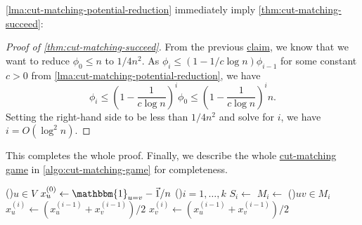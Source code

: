 \autoref{lma:cut-matching-potential-reduction} immediately imply \autoref{thm:cut-matching-succeed}:

\begin{proof}[Proof of \autoref{thm:cut-matching-succeed}]
	From the previous \hyperref[clm:cut-matching-goal]{claim}, we know that we want to reduce \(\phi _0 \leq n\) to \(1 / 4n^2\). As \(\phi _i \leq (1 - 1 / c \log n) \phi _{i-1}\) for some constant \(c>0\) from \autoref{lma:cut-matching-potential-reduction}, we have
	\[
		\phi _i \leq \left( 1 - \frac{1}{c \log n} \right) ^i \phi _0 \leq \left( 1 - \frac{1}{c \log n} \right) ^i n.
	\]
	Setting the right-hand side to be less than \(1 / 4n^2\) and solve for \(i\), we have \(i = O(\log ^2 n)\).
\end{proof}

This completes the whole proof. Finally, we describe the whole \hyperref[def:cut-matching-game]{cut-matching game} in \autoref{algo:cut-matching-game} for completeness.

\begin{algorithm}[H]\label{algo:cut-matching-game}
	\DontPrintSemicolon{}
	\caption{\hyperref[def:cut-matching-game]{Cut-Matching Game}}
	\BlankLine

	\For(){\(u \in V\)}{
	\(x_u^{(0)} \gets \mathbbm{1}_{u = v} - \vec{1} / n\)\;
	}
	\;
	\While(){\(i = 1, \dots , k\)}{
	\(S_i\gets\)\;
	\(M_i \gets\)\;
	\For(){\(uv \in M_i\)}{
	\(x_u^{(i)} \gets (x_u^{(i-1)} + x_v^{(i-1)}) / 2\)\;
	\(x_v^{(i)} \gets (x_u^{(i-1)} + x_v^{(i-1)}) / 2\)\;
	}
	}
	\;
	\;
	\;
\end{algorithm}

